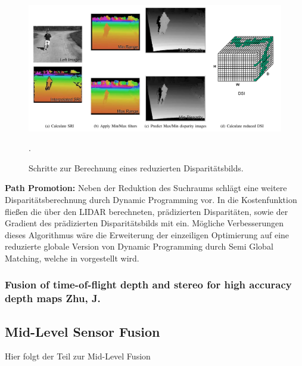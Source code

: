 \documentclass[10pt]{article}
\begin{document}
\begin{figure}[ht]\centering%
	\includegraphics[width=15cm]{images/png/badino_dsi_computation.png}
	\caption[Reduziertes Disparitätsbild]{ Schritte zur Berechnung eines reduzierten Disparitätsbilds. \cite{Badino2011a} }.
	\label{img:badino_computation}
\end{figure}

\textbf{Path Promotion:} Neben der Reduktion des Suchraums schlägt \cite{Badino2011a} eine weitere Disparitätsberechnung durch Dynamic Programming vor. In die Kostenfunktion fließen die über den LIDAR berechneten, prädizierten Disparitäten, sowie der Gradient des prädizierten Disparitätsbilds mit ein.
Mögliche Verbesserungen dieses Algorithmus wäre die Erweiterung der einzeiligen Optimierung auf eine reduzierte globale Version von Dynamic Programming durch Semi Global Matching, welche in \cite{Hirschmuller2005} vorgestellt wird.

\subsubsection*{Fusion of time-of-flight depth and stereo for high accuracy depth maps Zhu, J. \cite{Zhu2008}}

\subsection*{Mid-Level Sensor Fusion}

Hier folgt der Teil zur Mid-Level Fusion

\end{document}
